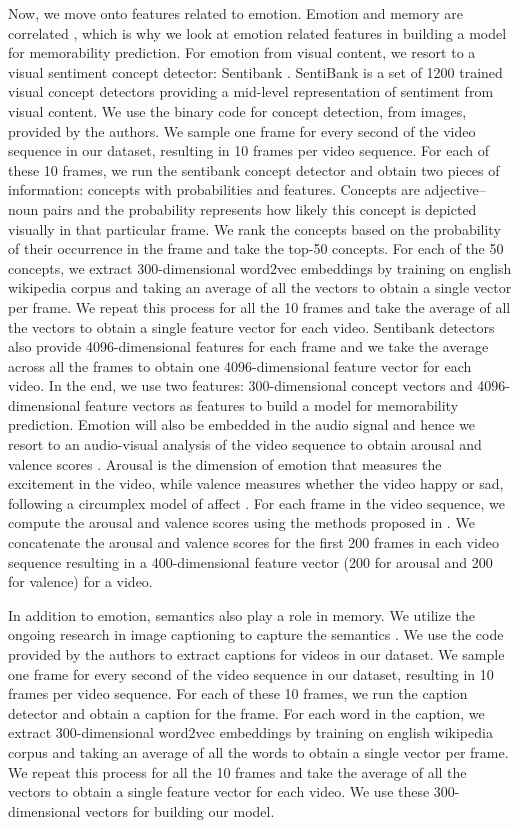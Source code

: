 \documentclass[sigconf]{acmart}
\begin{document}
Now, we move onto features related to emotion.
Emotion and memory are correlated \cite{}, which is why we look at emotion related features in building a model for memorability prediction.
For emotion from visual content, we resort to a visual sentiment concept detector: Sentibank \cite{sb-feat}.
SentiBank is a set of 1200 trained visual concept detectors providing a mid-level representation of sentiment from visual content.
We use the binary code for concept detection, from images, provided by the authors.
We sample one frame for every second of the video sequence in our dataset, resulting in 10 frames per video sequence.
For each of these 10 frames, we run the sentibank concept detector and obtain two pieces of information: concepts with probabilities and features.
Concepts are adjective--noun pairs and the probability represents how likely this concept is depicted visually in that particular frame.
We rank the concepts based on the probability of their occurrence in the frame and take the top-50 concepts.
For each of the 50 concepts, we extract 300-dimensional word2vec \cite{word2vec} embeddings by training on english wikipedia corpus and taking an average of all the vectors to obtain a single vector per frame.
We repeat this process for all the 10 frames and take the average of all the vectors to obtain a single feature vector for each video.
Sentibank detectors also provide 4096-dimensional features for each frame and we take the average across all the frames to obtain one 4096-dimensional feature vector for each video.
In the end, we use two features: 300-dimensional concept vectors and 4096-dimensional feature vectors as features to build a model for memorability prediction.
Emotion will also be embedded in the audio signal and hence we resort to an audio-visual analysis of the video sequence to obtain arousal and valence scores \cite{affect}.
Arousal is the dimension of emotion that measures the excitement in the video, while valence measures whether the video happy or sad, following a circumplex model of affect \cite{affect-model}.
For each frame in the video sequence, we compute the arousal and valence scores using the methods proposed in \cite{affect}.
We concatenate the arousal and valence scores for the first 200 frames in each video sequence resulting in a 400-dimensional feature vector (200 for arousal and 200 for valence) for a video.

In addition to emotion, semantics also play a role in memory.
We utilize the ongoing research in image captioning to capture the semantics \cite{caption-feat}.
We use the code provided by the authors to extract captions for videos in our dataset.
We sample one frame for every second of the video sequence in our dataset, resulting in 10 frames per video sequence.
For each of these 10 frames, we run the caption detector and obtain a caption for the frame.
For each word in the caption, we extract 300-dimensional word2vec \cite{word2vec} embeddings by training on english wikipedia corpus and taking an average of all the words to obtain a single vector per frame.
We repeat this process for all the 10 frames and take the average of all the vectors to obtain a single feature vector for each video.
We use these 300-dimensional vectors for building our model.
\end{document}
